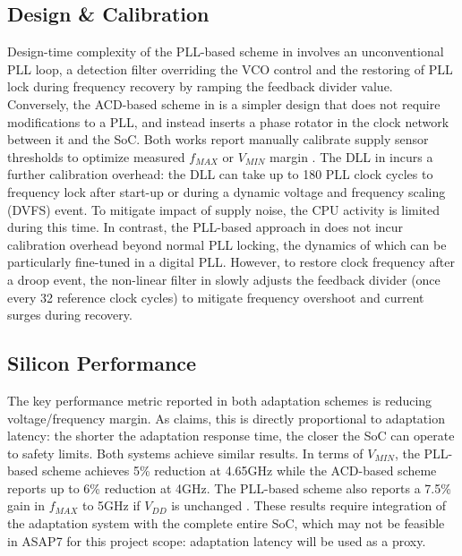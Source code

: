 \documentclass[twoside,9pt,journal,letterpage]{IEEEtran}
\begin{document}
\subsection{Design \& Calibration}
\label{sec:calibrationoverhead}
Design-time complexity of the PLL-based scheme in \cite{hashimoto2018} involves an unconventional PLL loop, a detection filter overriding the VCO control and the restoring of PLL lock during frequency recovery by ramping the feedback divider value. Conversely, the ACD-based scheme in \cite{wilcox2015} is a simpler design that does not require modifications to a PLL, and instead inserts a phase rotator in the clock network between it and the SoC. Both works report manually calibrate supply sensor thresholds to optimize measured $f_{MAX}$ or $V_{MIN}$ margin \cite{hashimoto2018,wilcox2015}. The DLL in \cite{wilcox2015} incurs a further calibration overhead: the DLL can take up to 180 PLL clock cycles to frequency lock after start-up or during a dynamic voltage and frequency scaling (DVFS) event. To mitigate impact of supply noise, the CPU activity is limited during this time. In contrast, the PLL-based approach in \cite{hashimoto2018} does not incur calibration overhead beyond normal PLL locking, the dynamics of which can be particularly fine-tuned in a digital PLL. However, to restore clock frequency after a droop event, the non-linear filter in \cite{hashimoto2018} slowly adjusts the feedback divider (once every 32 reference clock cycles) to mitigate frequency overshoot and current surges during recovery.

\subsection{Silicon Performance}
\label{sec:performance}
The key performance metric reported in both adaptation schemes is reducing voltage/frequency margin. As \cite{hashimoto2018} claims, this is directly proportional to adaptation latency: the shorter the adaptation response time, the closer the SoC can operate to safety limits. Both systems achieve similar results. In terms of $V_{MIN}$, the PLL-based scheme achieves 5\% reduction at 4.65GHz \cite{hashimoto2018} while the ACD-based scheme reports up to 6\% reduction \cite{wilcox2015} at 4GHz. The PLL-based scheme also reports a 7.5\% gain in $f_{MAX}$ to 5GHz if $V_{DD}$ is unchanged \cite{hashimoto2018}. These results require integration of the adaptation system with the complete entire SoC, which may not be feasible in ASAP7 for this project scope: adaptation latency will be used as a proxy.
\end{document}
